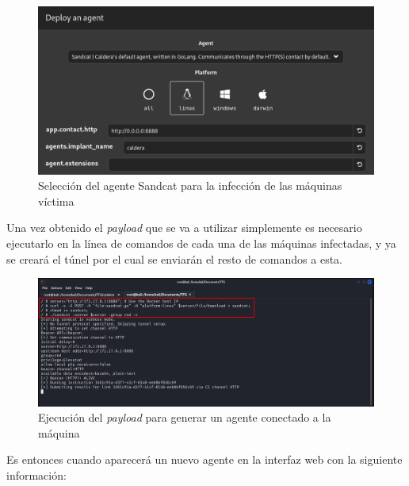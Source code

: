 \begin{figure}[H]
    \centering
    \includegraphics[width=1\linewidth]{imagenes/sandcat-agent.png}
    \caption{Selección del agente Sandcat para la infección de las máquinas víctima}
    \label{fig:sandcat-agent}
\end{figure}

Una vez obtenido el \textit{payload} que se va a utilizar simplemente es necesario ejecutarlo en la línea de comandos de cada una de las máquinas infectadas, y ya se creará el túnel por el cual se enviarán el resto de comandos a esta.

\begin{figure}[H]
    \centering
    \includegraphics[width=1\linewidth]{imagenes/ejecucion-payload.png}
    \caption{Ejecución del \textit{payload} para generar un agente conectado a la máquina}
    \label{fig:ejecucion-payload}
\end{figure}

Es entonces cuando aparecerá un nuevo agente en la interfaz web con la siguiente información:

